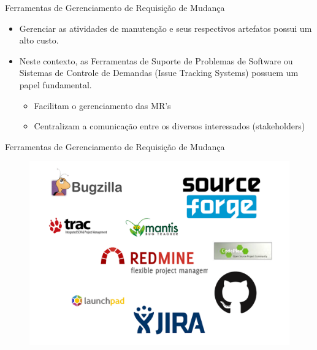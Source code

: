 \documentclass[t,14pt,mathserif]{beamer}
\begin{document}
\begin{frame}{Ferramentas de Gerenciamento de Requisição de Mudança}
	\begin{itemize}
        \item Gerenciar as atividades de manutenção e seus respectivos artefatos
            possui um alto custo.
        \item Neste contexto, as Ferramentas de Suporte de Problemas de Software
            ou Sistemas de Controle de Demandas (Issue Tracking Systems) possuem
            um papel fundamental.
			\begin{itemize}
				\item Facilitam o gerenciamento das MR's
                \item Centralizam a comunicação entre os diversos interessados
                    (stakeholders)
			\end{itemize}
	\end{itemize}
\end{frame}

\begin{frame}{Ferramentas de Gerenciamento de Requisição de Mudança}
		\begin{figure}[hbtp]
			\centering
			\includegraphics[scale=.3]{../img/issue-tracking-sytem.png}
		\end{figure}
\end{frame}
\end{document}

